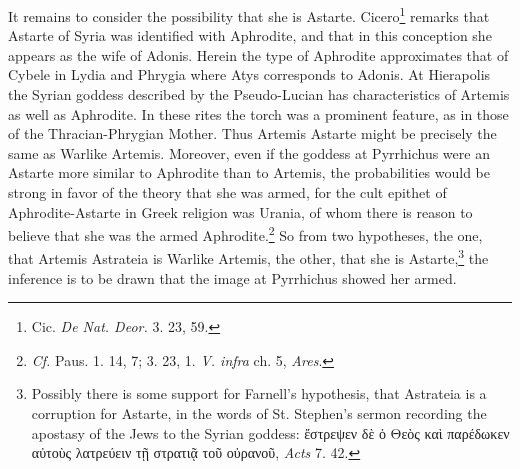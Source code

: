\documentclass[a4paper, 12pt, oneside]{article}
\begin{document}
It remains to consider the possibility that she is Astarte. Cicero\footnote{Cic. \emph{De Nat. Deor.} 3. 23, 59.} remarks that Astarte of Syria was identified with Aphrodite, and that in this conception she appears as the wife of Adonis. Herein the type of Aphrodite approximates that of Cybele in Lydia and Phrygia where Atys corresponds to Adonis. At Hierapolis the Syrian goddess described by the Pseudo-Lucian has characteristics of Artemis as well as Aphrodite. In these rites the torch was a prominent feature, as in those of the Thracian-Phrygian Mother. Thus Artemis Astarte might be precisely the same as Warlike Artemis. Moreover, even if the goddess at Pyrrhichus were an Astarte more similar to Aphrodite than to Artemis, the probabilities would be strong in favor of the theory that she was armed, for the cult epithet of Aphrodite-Astarte in Greek religion was Urania, of whom there is reason to believe that she was the armed Aphrodite.\footnote{\emph{Cf.} Paus. 1. 14, 7; 3. 23, 1. \emph{V. infra} ch. 5, \emph{Ares}.} So from two hypotheses, the one, that Artemis Astrateia is Warlike Artemis, the other, that she is Astarte,\footnote{Possibly there is some support for Farnell's hypothesis, that Astrateia is a corruption for Astarte, in the words of St. Stephen's sermon recording the apostasy of the Jews to the Syrian goddess: ἔστρεψεν δὲ ὁ Θεὸς καὶ παρέδωκεν αὐτοὺς λατρεύειν τῇ στρατιᾷ τοῦ οὐρανοῦ, \emph{Acts} 7. 42.} the inference is to be drawn that the image at Pyrrhichus showed her armed.
\end{document}
